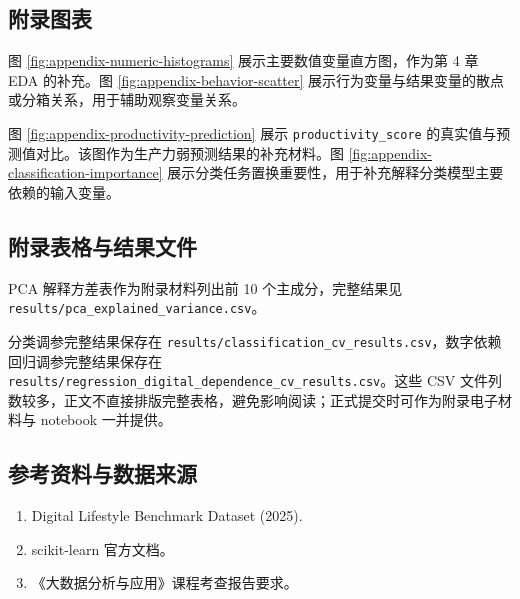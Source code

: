 \subsection{附录图表}

图 \ref{fig:appendix-numeric-histograms} 展示主要数值变量直方图，作为第 4 章 EDA 的补充。图 \ref{fig:appendix-behavior-scatter} 展示行为变量与结果变量的散点或分箱关系，用于辅助观察变量关系。



图 \ref{fig:appendix-productivity-prediction} 展示 \texttt{productivity\_score} 的真实值与预测值对比。该图作为生产力弱预测结果的补充材料。图 \ref{fig:appendix-classification-importance} 展示分类任务置换重要性，用于补充解释分类模型主要依赖的输入变量。



\subsection{附录表格与结果文件}

PCA 解释方差表作为附录材料列出前 10 个主成分，完整结果见 \texttt{results/pca\_explained\_variance.csv}。



分类调参完整结果保存在 \texttt{results/classification\_cv\_results.csv}，数字依赖回归调参完整结果保存在 \texttt{results/regression\_digital\_dependence\_cv\_results.csv}。这些 CSV 文件列数较多，正文不直接排版完整表格，避免影响阅读；正式提交时可作为附录电子材料与 notebook 一并提供。

\subsection{参考资料与数据来源}

\begin{enumerate}
  \item Digital Lifestyle Benchmark Dataset (2025).
  \item scikit-learn 官方文档。
  \item 《大数据分析与应用》课程考查报告要求。
\end{enumerate}
